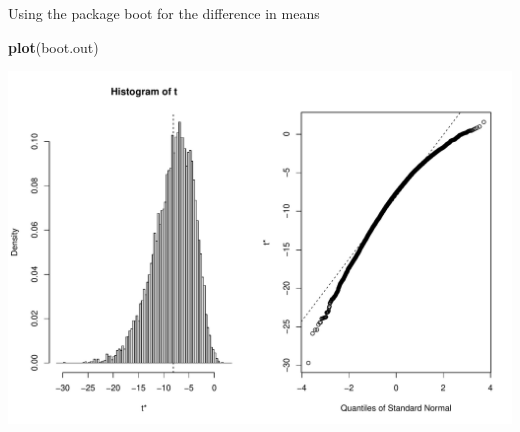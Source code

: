 \documentclass[
  ignorenonframetext,
]{beamer}
\newenvironment{Shaded}{\begin{snugshade}}{\end{snugshade}}
\newcommand{\FunctionTok}[1]{\textcolor[rgb]{0.13,0.29,0.53}{\textbf{#1}}}
\newcommand{\NormalTok}[1]{#1}
\begin{document}
\begin{frame}[fragile]{Using the package boot for the difference in
means}
\protect\hypertarget{using-the-package-boot-for-the-difference-in-means-1}{}
\tiny

\begin{Shaded}
\begin{Highlighting}[]
\FunctionTok{plot}\NormalTok{(boot.out)}
\end{Highlighting}
\end{Shaded}

\begin{center}\includegraphics[width=0.8\linewidth,height=0.45\textheight]{Week11_12_13_files/figure-beamer/unnamed-chunk-34-1} \end{center}
\normalsize
\end{frame}
\end{document}
